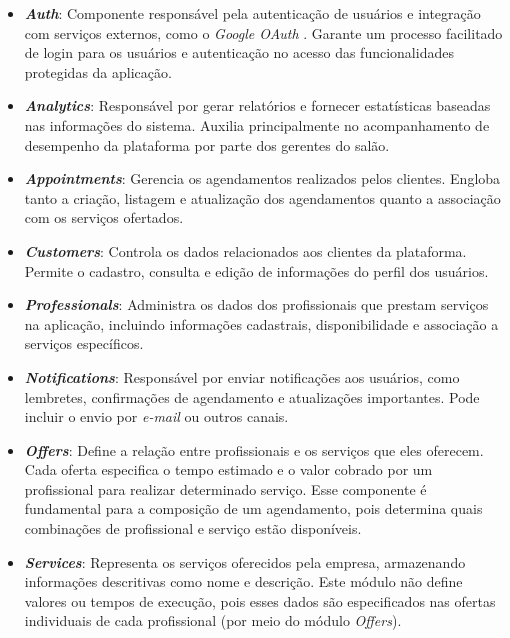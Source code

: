 \begin{itemize}
  \item \textbf{\emph{Auth}}: Componente responsável pela autenticação de usuários e integração com serviços externos, como o \emph{Google OAuth} \cite{GoogleOAuth}. Garante um processo facilitado de login para os usuários e autenticação no acesso das funcionalidades protegidas da aplicação.

  \item \textbf{\emph{Analytics}}: Responsável por gerar relatórios e fornecer estatísticas baseadas nas informações do sistema. Auxilia principalmente no acompanhamento de desempenho da plataforma por parte dos gerentes do salão.

  \item \textbf{\emph{Appointments}}: Gerencia os agendamentos realizados pelos clientes. Engloba tanto a criação, listagem e atualização dos agendamentos quanto a associação com os serviços ofertados.

  \item \textbf{\emph{Customers}}: Controla os dados relacionados aos clientes da plataforma. Permite o cadastro, consulta e edição de informações do perfil dos usuários.

  \item \textbf{\emph{Professionals}}: Administra os dados dos profissionais que prestam serviços na aplicação, incluindo informações cadastrais, disponibilidade e associação a serviços específicos.

  \item \textbf{\emph{Notifications}}: Responsável por enviar notificações aos usuários, como lembretes, confirmações de agendamento e atualizações importantes. Pode incluir o envio por \emph{e-mail} ou outros canais.

  \item \textbf{\emph{Offers}}: Define a relação entre profissionais e os serviços que eles oferecem. Cada oferta especifica o tempo estimado e o valor cobrado por um profissional para realizar determinado serviço. Esse componente é fundamental para a composição de um agendamento, pois determina quais combinações de profissional e serviço estão disponíveis.

  \item \textbf{\emph{Services}}: Representa os serviços oferecidos pela empresa, armazenando informações descritivas como nome e descrição. Este módulo não define valores ou tempos de execução, pois esses dados são especificados nas ofertas individuais de cada profissional (por meio do módulo \textit{Offers}).


\end{itemize}
